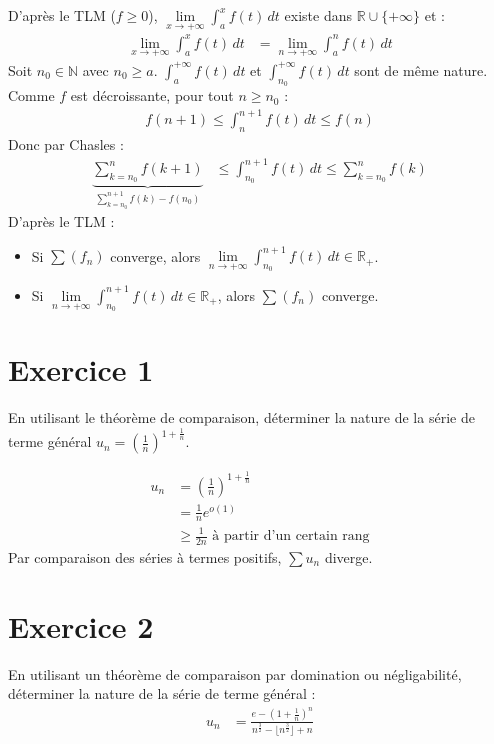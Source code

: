 \documentclass[../main.tex]{subfiles}
\begin{document}
\noindent D'après le TLM ($f\geq 0$), $\lim\limits_{x\to +\infty} \int_{a}^{x} f(t) \,dt$ existe dans $\mathbb{R}\cup \{+\infty\}$ et : 
\begin{align*}
    \lim_{x\to +\infty} \int_{a}^{x} f(t) \,dt &= \lim_{n\to +\infty} \int_{a}^{n} f(t) \,dt
\end{align*}
Soit $n_0\in \mathbb{N}$ avec $n_0 \geq a$. $\int_{a}^{+\infty} f(t) \,dt$ et $\int_{n_0}^{+\infty} f(t) \,dt$ sont de même nature. \\
Comme $f$ est décroissante, pour tout $n\geq n_0$ : 
\begin{align*}
    f(n+1) \leq \int_{n}^{n+1} f(t) \,dt \leq f(n)
\end{align*}
Donc par Chasles : 
\begin{align*}
    \underbrace{\sum_{k=n_0}^{n} f(k+1)}_{\sum\limits_{k=n_0}^{n+1} f(k) - f(n_0)} &\leq \int_{n_0}^{n+1} f(t) \,dt \leq \sum_{k=n_0}^{n} f(k)
\end{align*}
D'après le TLM : 
\begin{itemize}
    \item Si $\sum (f_n)$ converge, alors $\lim\limits_{n\to +\infty} \int_{n_0}^{n+1} f(t) \,dt\in \mathbb{R}_+$. 
    \item Si $\lim\limits_{n\to +\infty} \int_{n_0}^{n+1} f(t) \,dt\in \mathbb{R}_+$, alors $\sum (f_n)$ converge.
\end{itemize}

\section*{Exercice 1}
\begin{tcolorbox}[title=Exercice 27.1, title filled=false, colframe=darkgreen, colback=darkgreen!10!white]
    En utilisant le théorème de comparaison, déterminer la nature de la série de terme général $u_n = \left( \frac{1}{n} \right)^{1 + \frac{1}{n}}$. 
\end{tcolorbox}

\begin{align*}
    u_n &= \left( \frac{1}{n} \right)^{1 + \frac{1}{n}} \\
    &= \frac{1}{n} e^{o(1)} \\
    &\geq \frac{1}{2n} \text{ à partir d'un certain rang}
\end{align*}
Par comparaison des séries à termes positifs, $\sum u_n$ diverge.

\section*{Exercice 2}
\begin{tcolorbox}[title=Exercice 27.2, title filled=false, colframe=darkgreen, colback=darkgreen!10!white]
    En utilisant un théorème de comparaison par domination ou négligabilité, déterminer la nature de la série de terme général :
    \begin{align*}
        u_n &= \frac{e - \left( 1 + \frac{1}{n} \right)^n}{n^{\frac{3}{2}} - \lfloor n^{\frac{3}{2}} \rfloor + n}
    \end{align*}
\end{tcolorbox}
\end{document}
